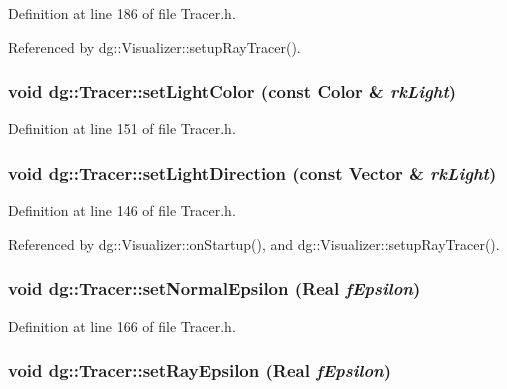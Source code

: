 Definition at line 186 of file Tracer.h.

Referenced by dg::Visualizer::setup\-Ray\-Tracer().
\subsubsection{\setlength{\rightskip}{0pt plus 5cm}void dg::Tracer::set\-Light\-Color (const {\bf Color} \& {\em rk\-Light})\hspace{0.3cm}{\tt  [inline]}}\label{classdg_1_1Tracer_a8}




Definition at line 151 of file Tracer.h.
\subsubsection{\setlength{\rightskip}{0pt plus 5cm}void dg::Tracer::set\-Light\-Direction (const {\bf Vector} \& {\em rk\-Light})\hspace{0.3cm}{\tt  [inline]}}\label{classdg_1_1Tracer_a6}




Definition at line 146 of file Tracer.h.

Referenced by dg::Visualizer::on\-Startup(), and dg::Visualizer::setup\-Ray\-Tracer().
\subsubsection{\setlength{\rightskip}{0pt plus 5cm}void dg::Tracer::set\-Normal\-Epsilon ({\bf Real} {\em f\-Epsilon})\hspace{0.3cm}{\tt  [inline]}}\label{classdg_1_1Tracer_a9}




Definition at line 166 of file Tracer.h.
\subsubsection{\setlength{\rightskip}{0pt plus 5cm}void dg::Tracer::set\-Ray\-Epsilon ({\bf Real} {\em f\-Epsilon})\hspace{0.3cm}{\tt  [inline]}}\label{classdg_1_1Tracer_a11}




